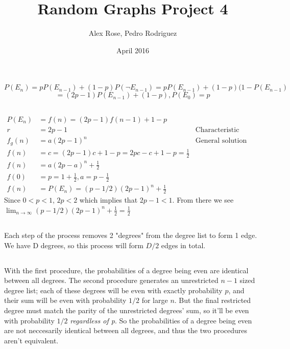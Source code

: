 \documentclass{article}
\title{\vspace{-5ex}Random Graphs Project 4}
\author{Alex Rose, Pedro Rodriguez}
\date{April 2016}
\begin{document}
\maketitle
\vspace{-15ex}
\section{}
\subsection{ }
\vspace{-2ex}
$$P(E_n) = pP(E_{n-1}) + (1-p)P(\neg E_{n-1}) = pP(E_{n-1}) + (1-p)(1- P(E_{n-1}) $$
$$ = (2p-1)P(E_{n-1}) + (1 - p), P(E_0) = p$$
\vspace{-6ex}
\subsection{} 
\vspace{-2ex}
$$
\begin{aligned}
P(E_n)&=f(n)=(2p-1)f(n-1)+1-p\\
r&=2p-1&\text{Characteristic function}\\
f_g(n)&=a(2p-1)^n&\text{General solution}\\
f(n)&=c=(2p-1)c+1-p=2pc-c+1-p=\frac{1}{2}\\
f(n)&=a(2p-a)^n+\frac{1}{2}\\
f(0)&=p=1+\frac{1}{2},a=p-\frac{1}{2}\\
f(n)&=P(E_n)=(p-1/2)(2p-1)^n+\frac{1}{2}
\end{aligned}
$$
Since $0<p<1$, $2p<2$ which implies that $2p-1<1$. From there we see $\lim_{n\rightarrow\infty}(p-1/2)(2p-1)^n+\frac{1}{2}=\frac{1}{2}$

\vspace{-2ex}
\subsection{}
\vspace{-2ex}
Each step of the process removes 2 "degrees" from the degree list to form 1 edge. We have D degrees, so this process will form $D/2$ edges in total.
\vspace{-2ex}
\subsection{}
\vspace{-2ex}
With the first procedure, the probabilities of a degree being even are identical between all degrees. The second procedure generates an unrestricted $n-1$ sized degree list; each of these degrees will be even with exactly probability $p$, and their sum will be even with probability $1/2$ for large $n$. But the final restricted degree must match the parity of the unrestricted degrees' sum, so it'll be even with probability $1/2$ \textit{regardless of p}. So the probabilities of a degree being even are not neccesarily identical between all degrees, and thus the two procedures aren't equivalent.
\end{document}
